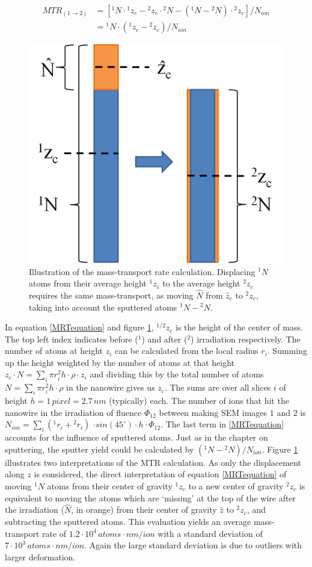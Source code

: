 \documentclass[12pt,
paper=a4,				
DIV=calc,		  %
BCOR=16mm,	  %
headinclude,
openany
]{scrbook}
\begin{document}
\begin{equation}  
\begin{split}
    MTR_{(1 \rightarrow 2)} & = [ {}^{1}N\cdot {}^{1}z_{c} -{}^{2}z_{c} \cdot {}^{2}N - ({}^{1}N - {}^{2}N) \cdot {}^{2}z_{c}]/N_{ion} \\
		& = {}^{1}N \cdot ({}^{1}z_{c} - {}^{2}z_{c})/N_{ion} 
	\label{MRTequation}
	\end{split}
\end{equation}

\begin{figure}
	\centering
		\includegraphics[width=.25\textwidth]{images/MTRillustration.png}
	\caption{Illustration of the mass-transport rate calculation. Displacing ${}^{1}N$ atoms from their average height ${}^{1}z_{c}$ to the average height ${}^{2}z_{c}$ requires the same mass-transport, as moving $\hat{N}$ from $\hat{z}_c$ to ${}^{2}z_{c}$, taking into account the sputtered atoms ${}^{1}N-{}^{2}N$.}
	\label{MTRillustration}
\end{figure}

In equation \ref{MRTequation} and figure \ref{MTRillustration}, ${}^{1/2}z_{c}$ is the height of the center of mass. The top left index indicates before ($^1$) and after ($^2$) irradiation respectively. The number of atoms at height $z_i$ can be calculated from the local radius $r_i$. Summing up the height weighted by the number of atoms at that height $z_{c} \cdot N = \sum_i{\pi r_i^2 h \cdot \rho \cdot z_i}$ and dividing this by the total number of atoms $N = \sum_i{\pi r_i^2 h \cdot \rho}$ in the nanowire gives us $z_{c}$. The sums are over all slices $i$ of height $h = 1\,pixel = 2.7\,nm$ (typically) each. The number of ions that hit the nanowire in the irradiation of fluence $\Phi_{12}$ between making SEM images $1$ and $2$ is $N_{ion} = \sum_i{({}^{1}r_i+{}^{2}r_i)}$ $\cdot sin(45^\circ) \cdot h \cdot \Phi_{12}$. The last term in  \ref{MRTequation} accounts for the influence of sputtered atoms. Just as in the chapter on sputtering, the sputter yield could be calculated by $({}^{1}N - {}^{2}N)/N_{ion}$. Figure \ref{MTRillustration} illustrates two interpretations of the MTR calculation. As only the displacement along $z$ is considered, the direct interpretation of equation \ref{MRTequation} of moving ${}^{1}N$ atoms from their center of gravity ${}^{1}z_{c}$ to a new center of gravity ${}^{2}z_{c}$ is equivalent to moving the atoms which are `missing' at the top of the wire after the irradiation ($\hat{N}$, in orange) from their center of gravity $\hat{z}$ to ${}^{2}z_{c}$, and subtracting the sputtered atoms. This evaluation yields an average mass-transport rate of $1.2\cdot10^4 \,atoms \cdot  nm / ion$ with a standard deviation of $7\cdot 10^3\,atoms \cdot  nm / ion$. Again the large standard deviation is due to outliers with larger deformation.
\end{document}
